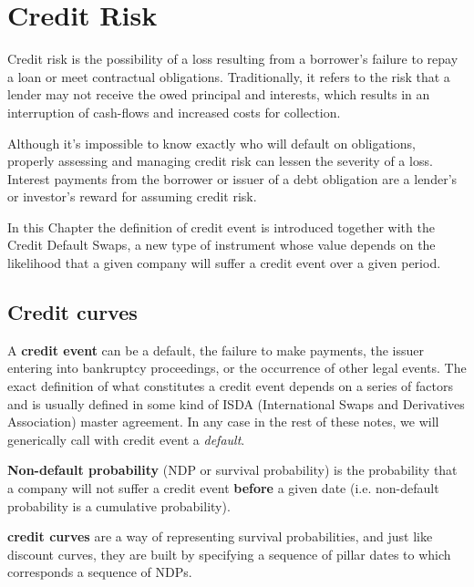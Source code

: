 \chapter{Credit Risk}\label{credit_default_swaps}

Credit risk is the possibility of a loss resulting from a borrower's failure to repay a loan or meet contractual obligations. Traditionally, it refers to the risk that a lender may not receive the owed principal and interests, which results in an interruption of cash-flows and increased costs for collection. 

Although it's impossible to know exactly who will default on obligations, properly assessing and managing credit risk can lessen the severity of a loss. Interest payments from the borrower or issuer of a debt obligation are a lender's or investor's reward for assuming credit risk.

In this Chapter the definition of credit event is introduced together with the Credit Default Swaps, a new type of instrument whose value depends on the likelihood that a given company will suffer a credit event over a given period.

\section{Credit curves}
\label{credit-curves}

A \textbf{credit event} can be a default, the failure to make payments, the issuer entering into bankruptcy proceedings, or the occurrence of other legal events. The exact definition of what constitutes a credit event depends on a series of factors and is usually defined in some kind of ISDA (International Swaps and Derivatives Association) master agreement. In any case in the rest of these notes, we will generically call with credit event a \emph{default}.

\textbf{Non-default probability} (NDP or survival probability) is the probability that a company will not suffer a credit event \textbf{before} a given date (i.e. non-default probability is a cumulative probability).

\textbf{credit curves} are a way of representing survival probabilities, and just like discount curves, they are built by specifying a sequence of pillar dates to which corresponds a sequence of NDPs. 


